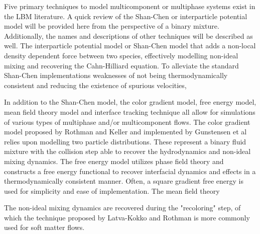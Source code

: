Five primary techniques to model multicomponent or multiphase systems exist in the LBM literature. A quick review of the Shan-Chen or 
interparticle potential model  will be provided here from the perspective of a binary mixture. Additionally, the names and descriptions of 
other techniques will be described as well. The interparticle potential model or Shan-Chen model that adds a non-local density dependent force 
between two species, effectively modelling non-ideal mixing and recovering the Cahn-Hilliard equation. To alleviate the standard Shan-Chen implementations 
weaknesses of not being thermodynamically consistent and reducing the existence of spurious velocities, 

In addition to the Shan-Chen model, the color gradient model, free energy model, mean field theory model and interface tracking technique all 
allow for simulations of various types of multiphase and/or multicomponent flows. The color gradient model proposed by Rothman and Keller and 
implemented by Gunstensen et al relies upon modelling two particle distributions. These represent a binary fluid mixture with the collision step 
able to recover the hydrodynamics and non-ideal mixing dynamics. The free energy model utilizes phase field theory and constructs a free energy 
functional to recover interfacial dynamics and effects in a thermodynamically consistent manner. Often, a square gradient free energy is used for 
simplicity and ease of implementation. The mean field theory 

The non-ideal mixing dynamics are recovered during the "recoloring" step, of which the technique proposed by Latva-Kokko and Rothman is more commonly 
used for soft matter flows. \cite{liu_multiphase_2016}
